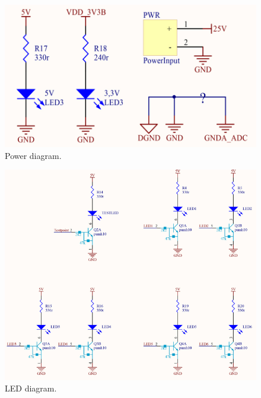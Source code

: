 \begin{figure}[H]
	\centering
	\includegraphics[scale=0.92]{figures/Power.pdf}
	\caption{Power diagram.}
	\label{labPower}
\end{figure}\vspace{-5mm}

\begin{figure}[H]
	\centering
	\includegraphics[scale=0.92]{figures/Led.pdf}
	\caption{LED diagram.}
	\label{labLed}
\end{figure}\vspace{-5mm}


